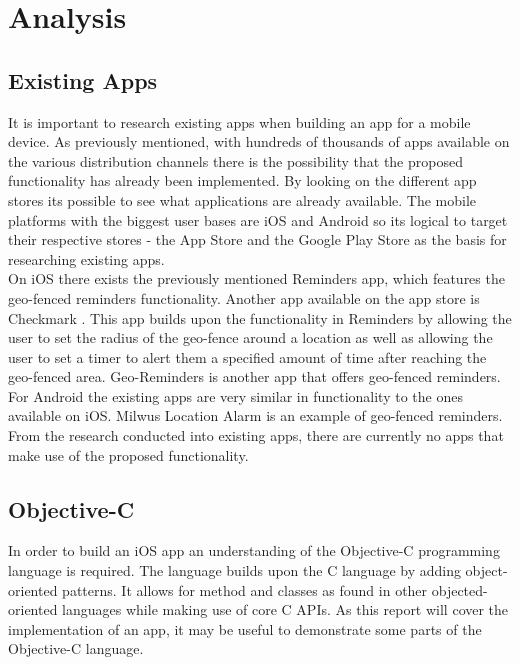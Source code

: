 \documentclass[12pt]{report}
\begin{document}
\chapter{Analysis}

\section{Existing Apps}

It is important to research existing apps when building an app for a mobile device. As previously mentioned, with hundreds of thousands of apps available on the various distribution channels there is the possibility that the proposed functionality has already been implemented. By looking on the different app stores  its possible to see what applications are already available. The  mobile platforms with the biggest user bases are iOS and Android so its logical to target their respective stores - the App Store \cite{appstore} and the Google Play Store \cite{playstore} as the basis for researching existing apps.\\

On iOS there exists the previously mentioned Reminders app, which features the geo-fenced reminders functionality. Another app available on the app store is Checkmark \cite{checkmark}. This app builds upon the functionality in Reminders by allowing the user to set the radius of the geo-fence around a location as well as allowing the user to set a timer to alert them a specified amount of time after reaching the geo-fenced area. Geo-Reminders \cite{tapone} is another app that offers geo-fenced reminders.\\

For Android the existing apps are very similar in functionality to the ones available on iOS. Milwus Location Alarm \cite{milwus} is an example of geo-fenced reminders.\\

From the research conducted into existing apps, there are currently no apps that make use of the proposed functionality.\\

\section{Objective-C}

In order to build an iOS app an understanding of the Objective-C programming language is required. The language builds upon the C language by adding object-oriented patterns. It allows for method and classes as found in other objected-oriented languages while making use of core C APIs. As this report will cover the implementation of an app, it may be useful to demonstrate some parts of the Objective-C language.\\
\end{document}
